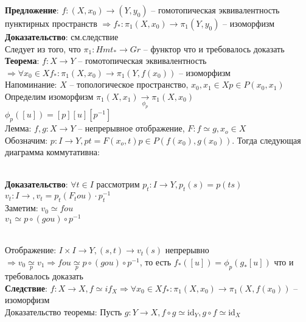 	\textbf{Предложение}: $f: (X,x_0) \rightarrow (Y,y_0)$ -- гомотопическая эквивалентность пунктирных пространств $\Rightarrow f_*: {\pi}_1 (X,x_0) \rightarrow {\pi}_1 (Y,y_0)$ -- изоморфизм\\
	\textbf{Доказательство}: см.следствие\\
	Следует из того, что ${\pi}_1: Hmt_* \rightarrow Gr$ -- функтор что и требовалось доказать\\
	\textbf{Теорема}: $f: X\rightarrow Y$ -- гомотопическая эквивалентность $\Rightarrow \forall x_0 \in X f_*: {\pi}_1 (X,x_0) \rightarrow {\pi}_1 (Y,f(x_0))$ -- изоморфизм\\
	Напоминание: $X$ -- топологическое пространство, $x_0, x_1 \in X p\in P(x_0,x_1)$\\
	Определим изоморфизм ${\pi}_1 (X,x_1) \underset{{\phi}_p}{\rightarrow} {\pi}_1 (X,x_0)$\\
	${\phi}_p ([u]) = [p][u][p^{-1}]$\\
	Лемма: $f,g: X\rightarrow Y$ -- непрерывное отображение, $F: f\simeq g, x_o \in X$\\
	Обозначим: $p: I \rightarrow Y, pt = F(x_o, t) p\in P(f(x_0), g(x_0))$. Тогда следующая диаграмма коммутативна:\\
	\begin{figure}[h]
	\end{figure}\\
	\textbf{Доказательство}: $\forall t\in I$ рассмотрим $p_t: I\rightarrow Y, p_t (s) = p(ts)$\\
	$v_t: I\rightarrow , v_t = p_t (F_t ou)\cdot p_t^{-1} $\\
	Заметим: $v_0 \simeq fou$\\
	$v_1 \simeq p \circ (gou) \circ p^{-1}$\\
	\begin{figure}[h]
	\end{figure}\\
	Отображение: $I\times I \rightarrow Y, (s,t)\rightarrow v_t (s)$ непрерывно $\Rightarrow v_0 \underset{p}{\simeq} v_1 \Rightarrow fou \underset{p}{\simeq} p \circ (gou) \circ p^{-1}$, то есть $f_* ([u]) = {\phi}_p (g_* [u])$ что и требовалось доказать\\
	\textbf{Следствие}: $f: X\rightarrow X, f\simeq if_X \Rightarrow \forall x_0 \in X f_*: {\pi}_1 (X,x_0) \rightarrow {\pi}_1 (X,f(x_0))$ -- изоморфизм\\
	Доказательство теоремы: Пусть $g: Y\rightarrow X, f \circ g \simeq  \text{id}_Y, g \circ f \simeq  \text{id}_X$\\
